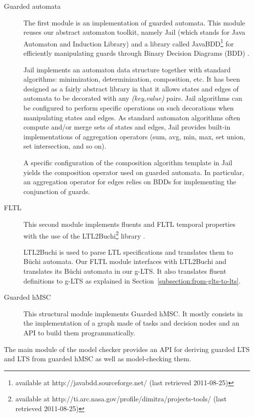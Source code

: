 \begin{description}
\item[Guarded automata] The first module is an implementation of guarded automata. This module reuses our abstract automaton toolkit, namely Jail (which stands for Java Automaton and Induction Library) and a library called JavaBDD\footnote{available at http://javabdd.sourceforge.net/ (last retrieved 2011-08-25)} for efficiently manipulating guards through Binary Decision Diagrams (BDD) \cite{Bryant:1986}.

Jail implements an automaton data structure together with standard algorithms:  minimization, determinization, composition, etc. It has been designed as a fairly abstract library in that it allows states and edges of automata to be decorated with any \emph{(key,value)} pairs. Jail algorithms can be configured to perform specific operations on such decorations when manipulating states and edges. As standard automaton algorithms often compute and/or merge sets of states and edges, Jail provides built-in implementations of aggregation operators (sum, avg, min, max, set union, set intersection, and so on).

A specific configuration of the composition algorithm template in Jail yields the composition operator used on guarded automata. In particular, an aggregation operator for edges relies on BDDs for implementing the conjunction of guards.

\item[FLTL] This second module implements fluents and FLTL temporal properties with the use of the LTL2Buchi\footnote{available at http://ti.arc.nasa.gov/profile/dimitra/projects-tools/ (last retrieved 2011-08-25)} library \cite{Giannakopoulou:2002}. 

LTL2Buchi is used to parse LTL specifications and translates them to B\"uchi automata. Our FLTL module interfaces with LTL2Buchi and translates its B\"uchi automata in our g-LTS. It also translates fluent definitions to g-LTS as explained in Section~\ref{subsection:from-glts-to-lts}.

\item[Guarded hMSC] This structural module implements Guarded hMSC. It mostly consists in the implementation of a graph made of tasks and decision nodes and an API to build them programmatically.
\end{description}

The main module of the model checker provides an API for deriving guarded LTS and LTS from guarded hMSC as well as model-checking them. 
